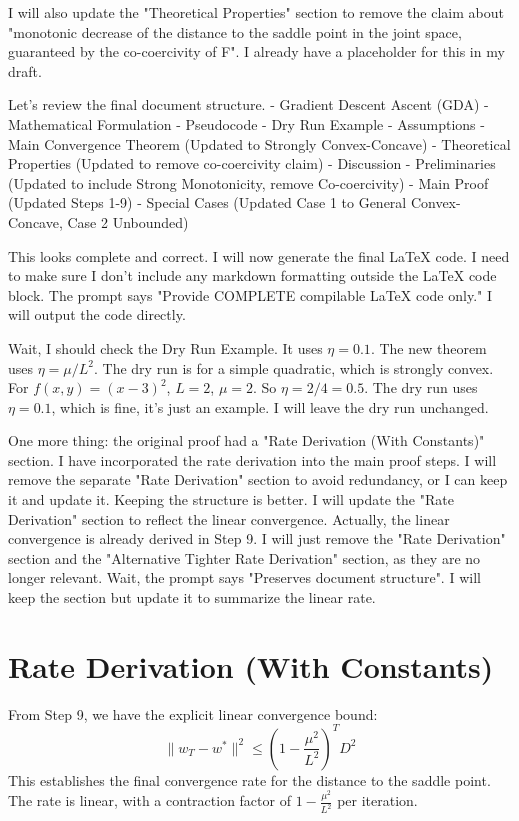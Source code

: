 \documentclass{article}
\begin{document}
I will also update the "Theoretical Properties" section to remove the claim about "monotonic decrease of the distance to the saddle point in the joint space, guaranteed by the co-coercivity of F".
I already have a placeholder for this in my draft.

Let's review the final document structure.
- Gradient Descent Ascent (GDA)
- Mathematical Formulation
- Pseudocode
- Dry Run Example
- Assumptions
- Main Convergence Theorem (Updated to Strongly Convex-Concave)
- Theoretical Properties (Updated to remove co-coercivity claim)
- Discussion
- Preliminaries (Updated to include Strong Monotonicity, remove Co-coercivity)
- Main Proof (Updated Steps 1-9)
- Special Cases (Updated Case 1 to General Convex-Concave, Case 2 Unbounded)

This looks complete and correct.
I will now generate the final LaTeX code.
I need to make sure I don't include any markdown formatting outside the LaTeX code block.
The prompt says "Provide COMPLETE compilable LaTeX code only."
I will output the code directly.

Wait, I should check the Dry Run Example.
It uses $\eta = 0.1$.
The new theorem uses $\eta = \mu/L^2$.
The dry run is for a simple quadratic, which is strongly convex.
For $f(x,y) = (x-3)^2$, $L=2$, $\mu=2$.
So $\eta = 2 / 4 = 0.5$.
The dry run uses $\eta = 0.1$, which is fine, it's just an example.
I will leave the dry run unchanged.

One more thing: the original proof had a "Rate Derivation (With Constants)" section.
I have incorporated the rate derivation into the main proof steps.
I will remove the separate "Rate Derivation" section to avoid redundancy, or I can keep it and update it.
Keeping the structure is better.
I will update the "Rate Derivation" section to reflect the linear convergence.
Actually, the linear convergence is already derived in Step 9.
I will just remove the "Rate Derivation" section and the "Alternative Tighter Rate Derivation" section, as they are no longer relevant.
Wait, the prompt says "Preserves document structure".
I will keep the section but update it to summarize the linear rate.
\section*{Rate Derivation (With Constants)}
From Step 9, we have the explicit linear convergence bound:
$$ \|w_T - w^*\|^2 \leq \left(1 - \frac{\mu^2}{L^2}\right)^T D^2 $$
This establishes the final convergence rate for the distance to the saddle point. The rate is linear, with a contraction factor of $1 - \frac{\mu^2}{L^2}$ per iteration.
\end{document}
